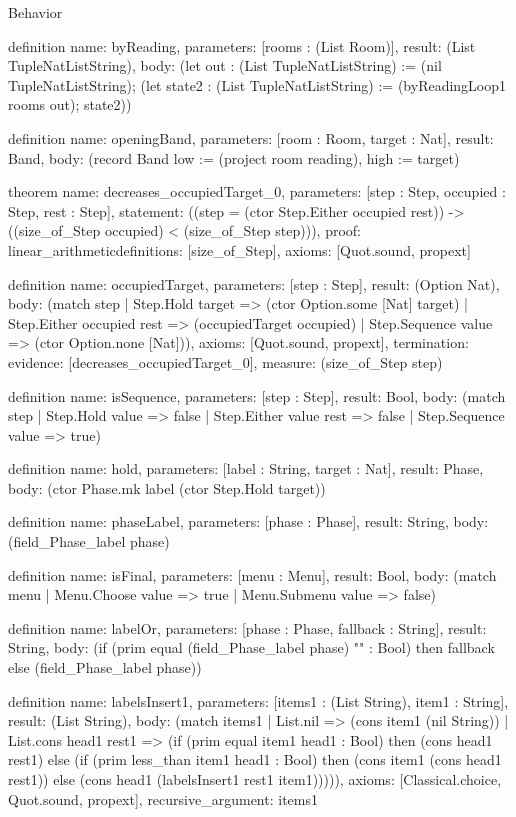 \begin{lexlean}{Behavior}
\begin{semanticmodule}
definition{
  name: byReading,
  parameters: [rooms : (List Room)],
  result: (List TupleNatListString),
  body: (let out : (List TupleNatListString) := (nil TupleNatListString); (let state2 : (List TupleNatListString) := (byReadingLoop1 rooms out); state2))
}

definition{
  name: openingBand,
  parameters: [room : Room, target : Nat],
  result: Band,
  body: (record Band {low := (project room reading), high := target})
}

theorem{
  name: decreases_occupiedTarget_0,
  parameters: [step : Step, occupied : Step, rest : Step],
  statement: ((step = (ctor Step.Either occupied rest)) -> ((size_of_Step occupied) < (size_of_Step step))),
  proof: linear_arithmetic{definitions: [size_of_Step]},
  axioms: [Quot.sound, propext]
}

definition{
  name: occupiedTarget,
  parameters: [step : Step],
  result: (Option Nat),
  body: (match step
    | Step.Hold target => (ctor Option.some [Nat] target)
    | Step.Either occupied rest => (occupiedTarget occupied)
    | Step.Sequence value => (ctor Option.none [Nat])),
  axioms: [Quot.sound, propext],
  termination: {evidence: [decreases_occupiedTarget_0], measure: (size_of_Step step)}
}

definition{
  name: isSequence,
  parameters: [step : Step],
  result: Bool,
  body: (match step
    | Step.Hold value => false
    | Step.Either value rest => false
    | Step.Sequence value => true)
}

definition{
  name: hold,
  parameters: [label : String, target : Nat],
  result: Phase,
  body: (ctor Phase.mk label (ctor Step.Hold target))
}

definition{
  name: phaseLabel,
  parameters: [phase : Phase],
  result: String,
  body: (field_Phase_label phase)
}

definition{
  name: isFinal,
  parameters: [menu : Menu],
  result: Bool,
  body: (match menu | Menu.Choose value => true | Menu.Submenu value => false)
}

definition{
  name: labelOr,
  parameters: [phase : Phase, fallback : String],
  result: String,
  body: (if (prim equal (field_Phase_label phase) "" : Bool) then fallback else (field_Phase_label phase))
}

definition{
  name: labelsInsert1,
  parameters: [items1 : (List String), item1 : String],
  result: (List String),
  body: (match items1
    | List.nil => (cons item1 (nil String))
    | List.cons head1 rest1 => (if (prim equal item1 head1 : Bool) then (cons head1 rest1) else (if (prim less_than item1 head1 : Bool) then (cons item1 (cons head1 rest1)) else (cons head1 (labelsInsert1 rest1 item1))))),
  axioms: [Classical.choice, Quot.sound, propext],
  recursive_argument: items1
}


\end{semanticmodule}
\end{lexlean}
